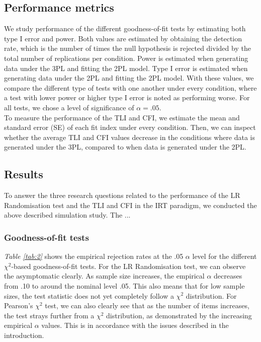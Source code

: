 \documentclass[Royal,sageapa,times,doublespace]{sagej}
\begin{document}
\subsection{Performance metrics}
We study performance of the different goodness-of-fit tests by estimating both type I error and power. Both values are estimated by obtaining the detection rate, which is the number of times the null hypothesis is rejected divided by the total number of replications per condition. Power is estimated when generating data under the 3PL and fitting the 2PL model. Type I error is estimated when generating data under the 2PL and fitting the 2PL model. With these values, we compare the different type of tests with one another under every condition, where a test with lower power or higher type I error is noted as performing worse. For all tests, we chose a level of significance of $\alpha = .05$. \\
\indent To measure the performance of the TLI and CFI, we estimate the mean and standard error (SE) of each fit index under every condition. Then, we can inspect whether the average TLI and CFI values decrease in the conditions where data is generated under the 3PL, compared to when data is generated under the 2PL. 

\subsection{Results}

To answer the three research questions related to the performance of the LR Randomisation test and the TLI and CFI in the IRT paradigm, we conducted the above described simulation study. The ...

\subsubsection{Goodness-of-fit tests}

\textit{Table \ref{tab:2}} shows the empirical rejection rates at the .05 $\alpha$ level for the different $\chi^2$-based goodness-of-fit tests. For the LR Randomisation test, we can observe the asymptomatic clearly. As sample size increases, the empirical $\alpha$ decreases from .10 to around the nominal level .05. This also means that for low sample sizes, the test statistic does not yet completely follow a $\chi^2$ distribution. For Pearson's $\chi^2$ test, we can also clearly see that as the number of items increases, the test strays further from a $\chi^2$ distribution, as demonstrated by the increasing empirical $\alpha$ values. This is in accordance with the issues described in the introduction.
\end{document}
